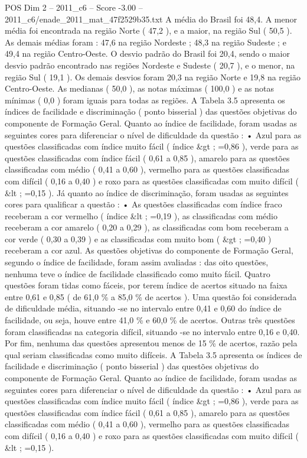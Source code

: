 \begin{textsample}{POS Dim 2 – 2011\_c6 – Score -3.00 – 2011\_c6/enade\_2011\_mat\_47f2529b35.txt}
A média do Brasil foi 48,4.
A menor média foi encontrada na região Norte ( 47,2 ), e a maior, na região Sul ( 50,5 ).
As demais médias foram : 47,6 na região Nordeste ; 48,3 na região Sudeste ; e 49,4 na região Centro-Oeste.
O desvio padrão do Brasil foi 20,4, sendo o maior desvio padrão encontrado nas regiões Nordeste e Sudeste ( 20,7 ), e o menor, na região Sul ( 19,1 ).
Os demais desvios foram 20,3 na região Norte e 19,8 na região Centro-Oeste.
As medianas ( 50,0 ), as notas máximas ( 100,0 ) e as notas mínimas ( 0,0 ) foram iguais para todas as regiões.
A Tabela 3.5 apresenta os índices de facilidade e discriminação ( ponto bisserial ) das questões objetivas do componente de Formação Geral.
Quanto ao índice de facilidade, foram usadas as seguintes cores para diferenciar o nível de dificuldade da questão : • Azul para as questões classificadas com índice muito fácil ( índice \&gt ; =0,86 ), verde para as questões classificadas com índice fácil ( 0,61 a 0,85 ), amarelo para as questões classificadas com médio ( 0,41 a 0,60 ), vermelho para as questões classificadas com difícil ( 0,16 a 0,40 ) e roxo para as questões classificadas com muito difícil ( \&lt ; =0,15 ).
Já quanto ao índice de discriminação, foram usadas as seguintes cores para qualificar a questão : • As questões classificadas com índice fraco receberam a cor vermelho ( índice \&lt ; =0,19 ), as classificadas com médio receberam a cor amarelo ( 0,20 a 0,29 ), as classificadas com bom receberam a cor verde ( 0,30 a 0,39 ) e as classificadas com muito bom ( \&gt ; =0,40 ) receberam a cor azul.
As questões objetivas do componente de Formação Geral, segundo o índice de facilidade, foram assim avaliadas : das oito questões, nenhuma teve o índice de facilidade classificado como muito fácil.
Quatro questões foram tidas como fáceis, por terem índice de acertos situado na faixa entre 0,61 e 0,85 ( de 61,0 \% a 85,0 \% de acertos ).
Uma questão foi considerada de dificuldade média, situando -se no intervalo entre 0,41 e 0,60 do índice de facilidade, ou seja, houve entre 41,0 \% e 60,0 \% de acertos.
Outras três questões foram classificadas na categoria difícil, situando -se no intervalo entre 0,16 e 0,40.
Por fim, nenhuma das questões apresentou menos de 15 \% de acertos, razão pela qual seriam classificadas como muito difíceis.
A Tabela 3.5 apresenta os índices de facilidade e discriminação ( ponto bisserial ) das questões objetivas do componente de Formação Geral.
Quanto ao índice de facilidade, foram usadas as seguintes cores para diferenciar o nível de dificuldade da questão : • Azul para as questões classificadas com índice muito fácil ( índice \&gt ; =0,86 ), verde para as questões classificadas com índice fácil ( 0,61 a 0,85 ), amarelo para as questões classificadas com médio ( 0,41 a 0,60 ), vermelho para as questões classificadas com difícil ( 0,16 a 0,40 ) e roxo para as questões classificadas com muito difícil ( \&lt ; =0,15 ).

\end{textsample}
